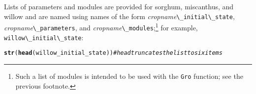 \documentclass{article}\usepackage[]{graphicx}\usepackage[]{color}
\makeatletter
\newcommand{\hlcom}[1]{\textcolor[rgb]{0.678,0.584,0.686}{\textit{#1}}}%
\newcommand{\hlstd}[1]{\textcolor[rgb]{0.345,0.345,0.345}{#1}}%
\newcommand{\hlkwd}[1]{\textcolor[rgb]{0.737,0.353,0.396}{\textbf{#1}}}%
\newenvironment{kframe}{%
 \def\at@end@of@kframe{}%
 \ifinner\ifhmode%
  \def\at@end@of@kframe{\end{minipage}}%
  \begin{minipage}{\columnwidth}%
 \fi\fi%
 \def\FrameCommand##1{\hskip\@totalleftmargin \hskip-\fboxsep
 \colorbox{shadecolor}{##1}\hskip-\fboxsep
     \hskip-\linewidth \hskip-\@totalleftmargin \hskip\columnwidth}%
 \MakeFramed {\advance\hsize-\width
   \@totalleftmargin\z@ \linewidth\hsize
   \@setminipage}}%
 {\par\unskip\endMakeFramed%
 \at@end@of@kframe}
\newenvironment{knitrout}{}{} %
\newcommand{\code}[1]{\lstinline[style=C++style]{#1}}
\makeatother
\begin{document}
Lists of parameters and modules are provided for sorghum, miscanthus,
and willow and are named using names of the form
\emph{cropname}\code{\_initial\_state},
\emph{cropname}\code{\_parameters}, and
\emph{cropname}\code{\_modules};\footnote{Such a list of modules is
  intended to be used with the \code{Gro} function; see the previous
  footnote.} for example, \code{willow\_initial\_state}:

\begin{knitrout}
\color{fgcolor}\begin{kframe}
\begin{alltt}
\hlkwd{str}\hlstd{(}\hlkwd{head}\hlstd{(willow_initial_state))} \hlcom{# head truncates the list to six items}
\end{alltt}


{\ttfamily\noindent\bfseries\color{errorcolor}{\#\# Error in head(willow\_initial\_state): object 'willow\_initial\_state' not found}}\end{kframe}
\end{knitrout}
\end{document}
